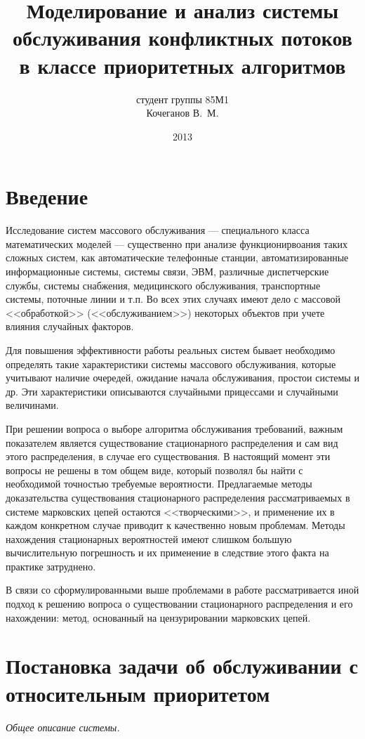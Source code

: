 \documentclass[a4paper,14pt,russian]{article}
\title{Моделирование и анализ системы обслуживания конфликтных потоков в классе приоритетных алгоритмов}
\author{студент группы 85М1\\ Кочеганов В.~М.}
\date{2013}
\begin{document}
\maketitle
\tableofcontents

\newpage
\section*{Введение}

Исследование систем массового обслуживания --- специального класса математических моделей --- существенно при анализе функционирвоания 
таких сложных систем, как автоматические телефонные станции, автоматизированные информационные системы, системы связи, 
ЭВМ, различные диспетчерские службы, системы снабжения, медицинского обслуживания, транспортные системы, поточные линии и т.п. 
Во всех этих случаях имеют дело с массовой <<обработкой>> (<<обслуживанием>>) некоторых объектов при учете влияния случайных факторов.

Для повышения эффективности работы реальных систем бывает необходимо определять такие характеристики системы массового обслуживания,
 которые учитывают наличие очередей, ожидание начала обслуживания, простои системы и др. Эти характеристики описываются случайными прицессами и случайными величинами.

При решении вопроса о выборе алгоритма обслуживания требований, важным показателем является существование стационарного распределения 
и сам  вид этого распределения, в случае его существования. В настоящий момент эти вопросы не решены в том общем виде, который позволял 
бы найти с необходимой точностью требуемые вероятности. Предлагаемые методы доказательства существования стационарного распределения 
рассматриваемых в системе марковских цепей остаются <<творческими>>, и применение их в каждом конкретном случае приводит к качественно 
новым проблемам. Методы нахождения стационарных вероятностей имеют слишком большую вычислительную погрешность и их применение в следствие этого факта на практике затруднено.

В связи со сформулированными выше проблемами в работе рассматривается иной подход к решению вопроса о существовании стационарного распределения 
и его нахождении: метод, основанный на цензурировании марковских цепей.

\newpage
\section{Постановка задачи об обслуживании с относительным приоритетом}
\textit{Общее описание системы.}
\end{document}
